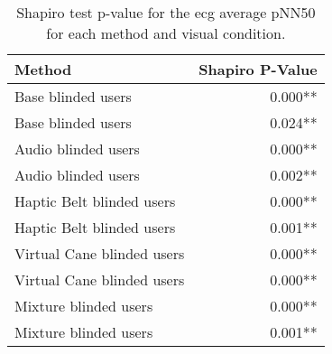 
\begin{table}[!htb]
\centering
\caption{Shapiro test p-value for the ecg average pNN50 for each method and visual condition.}
\label{tab:shapiro_ecg_pnn50}
\begin{tabular}{lr}
\toprule
                    Method & Shapiro P-Value \\
\midrule
        Base blinded users &         0.000** \\
        Base blinded users &         0.024** \\
       Audio blinded users &         0.000** \\
       Audio blinded users &         0.002** \\
 Haptic Belt blinded users &         0.000** \\
 Haptic Belt blinded users &         0.001** \\
Virtual Cane blinded users &         0.000** \\
Virtual Cane blinded users &         0.000** \\
     Mixture blinded users &         0.000** \\
     Mixture blinded users &         0.001** \\
\bottomrule
\end{tabular}
\end{table}

